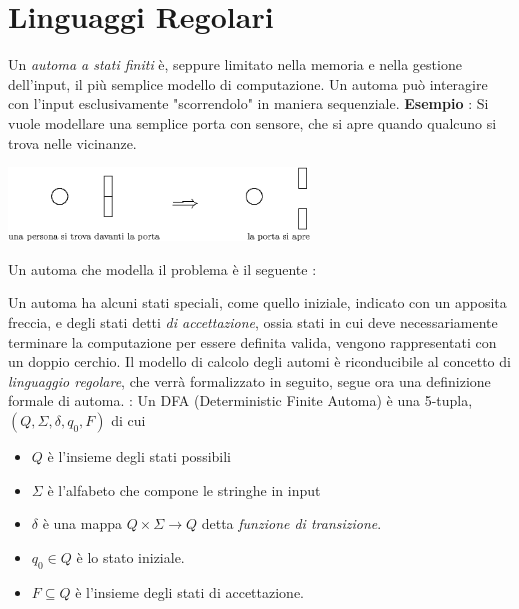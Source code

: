 \documentclass[10pt, letterpaper]{report}
\begin{document}
\section{Linguaggi Regolari}
Un \textit{automa a 
stati finiti} è, seppure limitato nella memoria e nella gestione 
dell'input, il più 
semplice modello di computazione. Un automa può interagire con l'input 
esclusivamente "scorrendolo" in maniera sequenziale.\acc 
\textbf{Esempio} : Si vuole modellare una semplice porta con sensore, che 
si apre quando qualcuno si trova nelle vicinanze.
\begin{center}
    \includegraphics[width=0.6\textwidth ]{images/porta.eps}
\end{center}
Un automa che modella il problema è il seguente :\begin{center}
    
    
\end{center} 
Un automa ha alcuni stati speciali, come quello iniziale, indicato 
con un apposita freccia, e degli stati detti \textit{di accettazione}, 
ossia stati in cui deve necessariamente terminare la computazione per 
essere definita valida, vengono rappresentati con un doppio cerchio.
\acc 
Il modello di calcolo degli automi è riconducibile al concetto di 
\textit{linguaggio regolare}, che verrà formalizzato in seguito, 
segue ora una definizione formale di automa.\acc 
{} : Un DFA (Deterministic Finite Automa) è una 
5-tupla, $(Q,\Sigma,\delta, q_0, F)$ di cui\begin{itemize}
    \item $Q$ è l'insieme degli stati possibili 
    \item $\Sigma$ è l'alfabeto che compone le stringhe in input 
    \item $\delta$ è una mappa $Q\times \Sigma \rightarrow Q$ detta 
    \textit{funzione di transizione}. 
    \item $q_0\in Q$ è lo stato iniziale. 
    \item $F\subseteq Q$ è l'insieme degli stati di accettazione.
\end{itemize}
\end{document}
